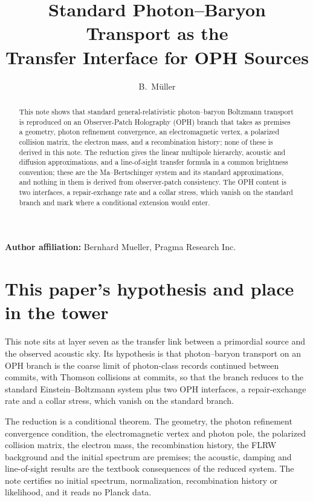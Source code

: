 \documentclass[11pt]{article}
\title{Standard Photon--Baryon Transport as the\\
Transfer Interface for OPH Sources}
\author{B.\ M\"uller}
\date{\OPHPaperReleaseDate}
\theoremstyle{remark}
\begin{document}
\maketitle
\OPHPaperReleaseBanner

\begin{center}
\small\textbf{Author affiliation:} Bernhard Mueller, Pragma Research Inc.
\end{center}

\begin{abstract}
This note shows that standard general-relativistic photon--baryon Boltzmann
transport is reproduced on an Observer-Patch Holography (OPH) branch that
takes as premises a geometry, photon refinement convergence, an
electromagnetic vertex, a polarized collision matrix, the electron mass, and
a recombination history; none of these is derived in this note. The
reduction gives the linear multipole hierarchy, acoustic and diffusion
approximations, and a line-of-sight transfer formula in a common brightness
convention; these are the Ma--Bertschinger system and its standard
approximations, and nothing in them is derived from observer-patch
consistency. The OPH content is two interfaces, a repair-exchange rate and a
collar stress, which vanish on the standard branch and mark where a
conditional extension would enter.
\end{abstract}



\section*{This paper's hypothesis and place in the tower}

This note sits at layer seven as the transfer link between a primordial
source and the observed acoustic sky. Its hypothesis is that photon--baryon
transport on an OPH branch is the coarse limit of photon-class records
continued between commits, with Thomson collisions at commits, so that the
branch reduces to the standard Einstein--Boltzmann system plus two OPH
interfaces, a repair-exchange rate and a collar stress, which vanish on the
standard branch.

The reduction is a conditional theorem. The geometry, the photon refinement
convergence condition, the electromagnetic vertex and photon pole, the
polarized collision matrix, the electron mass, the recombination history,
the FLRW background and the initial spectrum are premises; the acoustic,
damping and line-of-sight results are the textbook consequences of the
reduced system. The note certifies no initial spectrum, normalization,
recombination history or likelihood, and it reads no Planck data.
\end{document}
